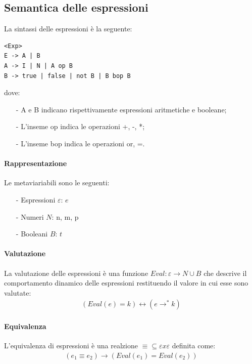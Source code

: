 \documentclass[a4paper, 10pt]{report}
\begin{document}
\subsection*{Semantica delle espressioni}
La sintassi delle espressioni è la seguente:
\lstset{language=C}
\begin{lstlisting}
<Exp>
E -> A | B
A -> I | N | A op B
B -> true | false | not B | B bop B
\end{lstlisting}

\noindent dove:
\begin{itemize}
\item[-] A e B indicano rispettivamente espressioni aritmetiche e booleane;
\item[-] L'inseme op indica le operazioni {+, -, *};
\item[-] L'inseme bop indica le operazioni {or, =}.
\end{itemize}

\paragraph*{Rappresentazione} Le metaviariabili sono le seguenti:
\begin{itemize}
\item[-] Espressioni $\varepsilon$: $e$
\item[-] Numeri $N$: n, m, p
\item[-] Booleani $B$: $t$
\end{itemize}

\paragraph*{Valutazione} La valutazione delle espressioni è una funzione $Eval: \varepsilon \rightarrow N \cup B$ che descrive il comportamento dinamico delle espressioni restituendo il valore in cui esse sono valutate:
\begin{align*}
(Eval(e) = k) \longleftrightarrow (e \rightarrow^* k)
\end{align*}

\paragraph*{Equivalenza}L'equivalenza di espressioni è una realzione $\equiv \subseteq \varepsilon x \varepsilon$   definita come:
\begin{align*}
(e_1 \equiv e_2) \longrightarrow (Eval(e_1) = Eval(e_2))
\end{align*}
\end{document}
